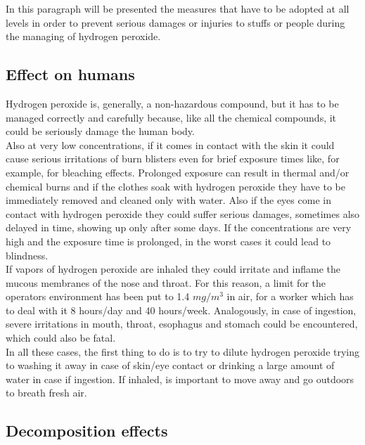 \documentclass[a4paper]{report}
\begin{document}
In this paragraph will be presented the measures that have to be adopted at all levels in order to prevent serious damages or injuries to stuffs or people during the managing of hydrogen peroxide. 

\subsection{Effect on humans}

Hydrogen peroxide is, generally, a non-hazardous compound, but it has to be managed correctly and carefully because, like all the chemical compounds, it could be seriously damage the human body. \\
Also at very low concentrations, if it comes in contact with the skin it could cause serious irritations of burn blisters even for brief exposure times like, for example, for bleaching effects. Prolonged exposure can result in thermal and/or chemical burns and if the clothes soak with hydrogen peroxide they have to be immediately removed and cleaned only with water. Also if the eyes come in contact with hydrogen peroxide they could suffer serious damages, sometimes also delayed in time, showing up only after some days. If the concentrations are very high and the exposure time is prolonged, in the worst cases it could lead to blindness. \\
If vapors of hydrogen peroxide are inhaled they could irritate and inflame the mucous membranes of the nose and throat. For this reason, a limit for the operators environment has been put to 1.4 $mg/m^3$ in air, for a worker which has to deal with it 8 hours/day and 40 hours/week. Analogously, in case of ingestion, severe irritations in mouth, throat, esophagus and stomach could be encountered, which could also be fatal. \\
In all these cases, the first thing to do is to try to dilute hydrogen peroxide trying to washing it away in case of skin/eye contact or drinking a large amount of water in case if ingestion. If inhaled, is important to move away and go outdoors to breath fresh air.\\

\subsection{Decomposition effects}
\end{document}

